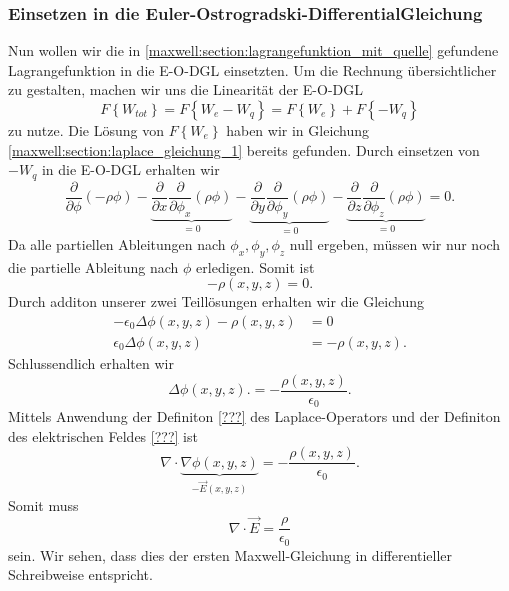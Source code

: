 \subsubsection{Einsetzen in die Euler-Ostrogradski-DifferentialGleichung}
Nun wollen wir die in \eqref{maxwell:section:lagrangefunktion_mit_quelle} gefundene Lagrangefunktion in die E-O-DGL einsetzten.
Um die Rechnung übersichtlicher zu gestalten, machen wir uns die Linearität der E-O-DGL
\begin{equation}
F\left\{W_{tot}\right\}
=
F\left\{W_e - W_q\right\}
=
F\left\{W_e\right\} + F\left\{-W_q\right\}
\label{maxwell:section:linearität_von_DGL}
\end{equation}
zu nutze.
Die Lösung von $F\left\{W_e\right\}$ haben wir in Gleichung \eqref{maxwell:section:laplace_gleichung_1} bereits gefunden.
Durch einsetzen von $-W_q$ in die E-O-DGL erhalten wir
\[
\frac{\partial}{\partial\phi}\left(-\rho\phi\right) - \underbrace{\frac{\partial}{\partial x}\frac{\partial}{\partial\phi_x}\left(\rho\phi\right)}_{=0} - \underbrace{\frac{\partial}{\partial y}\frac{\partial}{\partial\phi_y}\left(\rho\phi\right)}_{=0} - \underbrace{\frac{\partial}{\partial z}\frac{\partial}{\partial\phi_z}\left(\rho\phi\right)}_{=0}
=
0.
\]
Da alle partiellen Ableitungen nach $\phi_x, \phi_y, \phi_z$ null ergeben, müssen wir nur noch die partielle Ableitung nach $\phi$ erledigen.
Somit ist
\begin{equation}
-\rho(x,y,z)
=
0.
\end{equation}
Durch additon unserer zwei Teillösungen erhalten wir die Gleichung
\begin{align*}
-\epsilon_0\Delta\phi(x,y,z) - \rho(x,y,z)
&=
0
\\
\epsilon_0\Delta\phi(x,y,z)
&=
-\rho(x,y,z).
\end{align*}
Schlussendlich erhalten wir
\begin{equation}
\Delta\phi(x,y,z).
=
-\frac{\rho(x,y,z)}{\epsilon_0}.
\label{maxwell:section:erste_maxwellgleichung_1}
\end{equation}
Mittels Anwendung der Definiton \ref{???} des Laplace-Operators und der Definiton des elektrischen Feldes \ref{???} ist
\[
\nabla\cdot\underbrace{\nabla\phi(x,y,z)}_{-\vec{E}(x,y,z)}
=
-\frac{\rho(x,y,z)}{\epsilon_0}.
\]
Somit muss
\begin{equation}
\nabla\cdot\vec{E}
=
\frac{\rho}{\epsilon_0}
\label{maxwell:section:erste_maxwellgleichung_2}
\end{equation}
sein.
Wir sehen, dass dies der ersten Maxwell-Gleichung in differentieller Schreibweise entspricht.


